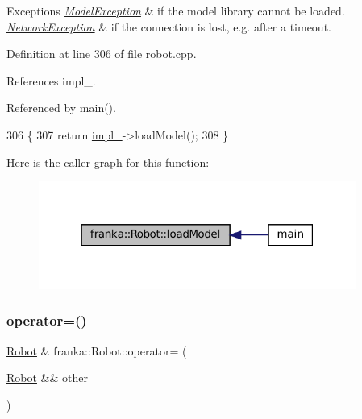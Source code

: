 \begin{DoxyExceptions}{Exceptions}
{\em \hyperlink{structfranka_1_1ModelException}{Model\+Exception}} & if the model library cannot be loaded. \\
\hline
{\em \hyperlink{structfranka_1_1NetworkException}{Network\+Exception}} & if the connection is lost, e.\+g. after a timeout. \\
\hline
\end{DoxyExceptions}


Definition at line 306 of file robot.\+cpp.



References impl\+\_\+.



Referenced by main().


\begin{DoxyCode}
306                        \{
307   \textcolor{keywordflow}{return} \hyperlink{classfranka_1_1Robot_aca155054184e5b6478942fd6a1b82ba4}{impl\_}->loadModel();
308 \}
\end{DoxyCode}
Here is the caller graph for this function\+:
\nopagebreak
\begin{figure}[H]
\begin{center}
\leavevmode
\includegraphics[width=295pt]{classfranka_1_1Robot_a2da598c539469827409ac7e3bb61d5da_icgraph}
\end{center}
\end{figure}
\mbox{\label{classfranka_1_1Robot_a2ea3ee0a2e18796972fd8d93822e7998}} 
\subsubsection{\texorpdfstring{operator=()}{operator=()}}
{\footnotesize\ttfamily \hyperlink{classfranka_1_1Robot}{Robot} \& franka\+::\+Robot\+::operator= (\begin{DoxyParamCaption}\item[{\hyperlink{classfranka_1_1Robot}{Robot} \&\&}]{other }\end{DoxyParamCaption})\hspace{0.3cm}{\ttfamily [noexcept]}}

